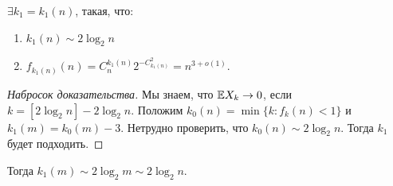 

\begin{proposition}
        \(\exists k_1 = k_1(n)\), такая, что:
        \begin{enumerate}
            \item \(k_1(n) \sim 2\log_2n\)
            \item \(f_{k_1(n)}(n) = C_n^{k_1(n)}2^{-C_{k_1(n)}^2}= n^{3 + o(1)}\).
        \end{enumerate}
    \end{proposition}
    \begin{proof}[Набросок доказательства]
        Мы знаем, что \(\mathbb{E} X_k \rightarrow 0\), если \(k = [2\log_2n] - 2\log_2n\). Положим \(k_0(n) = \min\{k: f_k(n) < 1\}\) и \(k_1(m) = k_0(m) - 3\). Нетрудно проверить, что \(k_0(n) \sim 2\log_2n\). Тогда \(k_1\) будет подходить.
    \end{proof}

    Тогда \(k_1(m) \sim 2\log_2m \sim 2\log_2n\).

